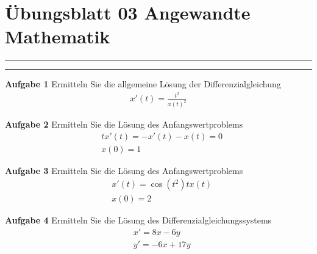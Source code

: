 \documentclass[a4paper,13pt]{scrartcl}
\begin{document}
\section*{\large  Übungsblatt 03 \hfill Angewandte Mathematik }
\hrule
\hrule
\vspace{4mm}
{\bf Aufgabe 1}
Ermitteln Sie die allgemeine Lösung der  Differenzialgleichung
\begin{align*}
x'(t) = \frac{t^2}{x(t)^2}
\end{align*}
\vspace{8mm}

{\bf Aufgabe 2}
Ermitteln Sie die  Lösung des Anfangswertproblems
\begin{align*}
& t x'(t) = -x'(t) - x(t) = 0 \\
& x(0) = 1
\end{align*}
\vspace{8mm}

{\bf Aufgabe 3}
Ermitteln Sie die Lösung des Anfangswertproblems
\begin{align*}
& x'(t) = \cos(t^2) t x(t) \\
& x(0) = 2
\end{align*}
\vspace{8mm}

{\bf Aufgabe 4}
Ermitteln Sie die Lösung des  Differenzialgleichungssystems
\begin{align*}
& x' = 8x -6y \\
& y' = -6x +17y
\end{align*}
\vspace{8mm}
\end{document}
